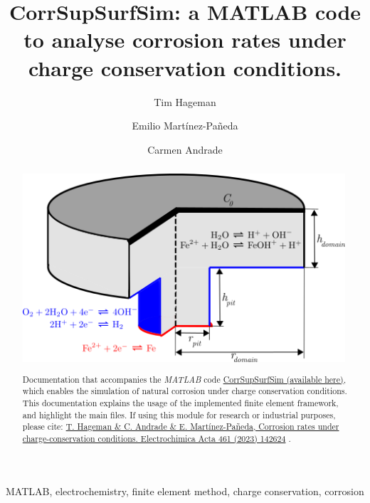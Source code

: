 \documentclass[3p]{elsarticle} %
\newcommand{\citeMe}{\href{https://doi.org/10.1016/j.electacta.2023.142624}{T. Hageman \& C. Andrade \& E. Martínez-Pañeda, Corrosion rates under charge-conservation conditions. Electrochimica Acta 461 (2023) 142624} \citep{Hageman2023}}
\begin{document}
\begin{frontmatter}
\title{Corr\textunderscore Sup\textunderscore Surf\textunderscore Sim: a MATLAB code to analyse corrosion rates under charge conservation conditions.}

\author[1]{Tim Hageman }
\author[1]{Emilio Martínez-Pañeda}
\author[2]{Carmen Andrade}

\address[1]{Department of Civil and Environmental Engineering, Imperial College London, London SW7 2AZ, UK}
\address[2]{International Center of Numerical Methods in Engineering (CIMNE), Madrid 28010, Spain}

\begin{abstract}
\begin{center}
\includegraphics[width=12cm]{../Figures/Domain.png}
\end{center}
Documentation that accompanies the \textit{MATLAB} code \href{https://github.com/T-Hageman/Corr_Sup_Surf_Sim}{Corr\textunderscore Sup\textunderscore Surf\textunderscore Sim (available here)}, which enables the simulation of natural corrosion under charge conservation conditions. This documentation explains the usage of the implemented finite element framework, and highlight the main files. If using this module for research or industrial purposes, please cite: \citeMe{}.
\end{abstract}

\begin{keyword}
MATLAB, electrochemistry, finite element method, charge conservation, corrosion
\end{keyword}

\end{frontmatter}

\tableofcontents
\end{document}
